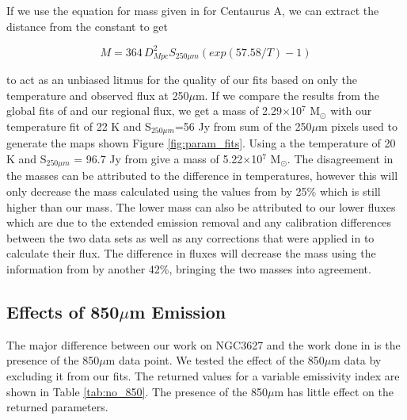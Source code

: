If we use the equation for mass given in \cite{parkin2012} for Centaurus A, we can extract the distance from the constant to get 

\begin{equation}\label{eq:mass_test}
  M=364\,D^{2}_{Mpc}S_{250\mu m}\left(exp(57.58 / T) - 1\right)
\end{equation}

\noindent to act as an unbiased litmus for the quality of our fits based on only the temperature and observed flux at 250$\mu$m.  If we compare the results from the global fits of \cite{galametz2012} and our regional flux, we get a mass of 2.29$\times$10$^{7}$ M$_\odot$ with our temperature fit of 22 K and S$_{250\mu m}$=56 Jy from sum of the 250$\mu$m pixels used to generate the maps shown Figure \ref{fig:param_fits}.  Using a the temperature of 20 K and S$_{250\mu m}$ = 96.7 Jy from \cite{galametz2012} give a mass of 5.22$\times$10$^7$ M$_\odot$.  The disagreement in the masses can be attributed to the difference in temperatures, however this will only decrease the mass calculated using the values from \cite{galametz2012} by 25\% which is still higher than our mass.  The lower mass can also be attributed to our lower fluxes which are due to the extended emission removal and any calibration differences between the two data sets as well as any corrections that were applied in \cite{galametz2012} to calculate their flux.  The difference in fluxes will decrease the mass using the information from \cite{galametz2012} by another 42\%, bringing the two masses into agreement.

\subsection{Effects of 850$\mu$m Emission}

The major difference between our work on NGC3627 and the work done in \cite{galametz2012} is the presence of the 850$\mu$m data point.  We tested the effect of the 850$\mu$m data by excluding it from our fits.  The returned values for a variable emissivity index are shown in Table \ref{tab:no_850}.  The presence of the 850$\mu$m has little effect on the returned parameters.  

